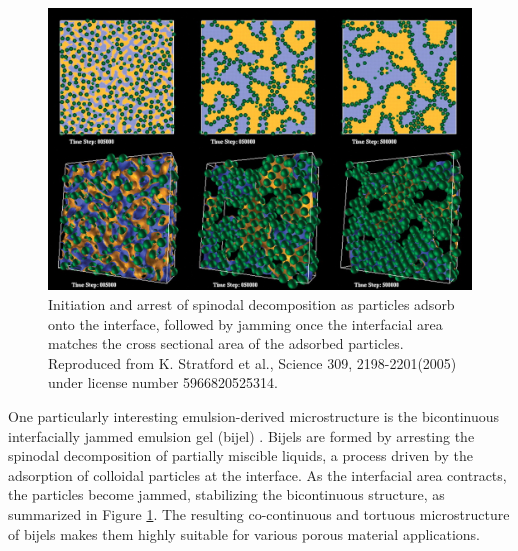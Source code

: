 \begin{figure}
    \centering
    \includegraphics[scale = 0.3]{figures/introduction/bijel_coarsening.jpg}
    \caption{Initiation and arrest of spinodal decomposition as particles adsorb onto the interface, followed by jamming once the 
    interfacial area matches the cross sectional area of the adsorbed particles\cite{stratford_colloidal_2005}. 
    Reproduced from K. Stratford et al., Science 309, 2198-2201(2005) under license number 5966820525314.}
    \label{fig:bijel_coarsen}
\end{figure}

One particularly interesting emulsion-derived microstructure is the bicontinuous interfacially jammed emulsion gel (bijel) 
\cite{stratford_colloidal_2005, herzig_bicontinuous_2007, lee_bicontinuous_2010}. Bijels are formed by arresting the spinodal decomposition of partially 
miscible liquids, a process driven by the adsorption of colloidal particles at the interface. As the interfacial area contracts, the particles become 
jammed, stabilizing the bicontinuous structure, as summarized in Figure \ref{fig:bijel_coarsen}. The resulting co-continuous and tortuous microstructure 
of bijels makes them highly suitable for various porous material applications.  

